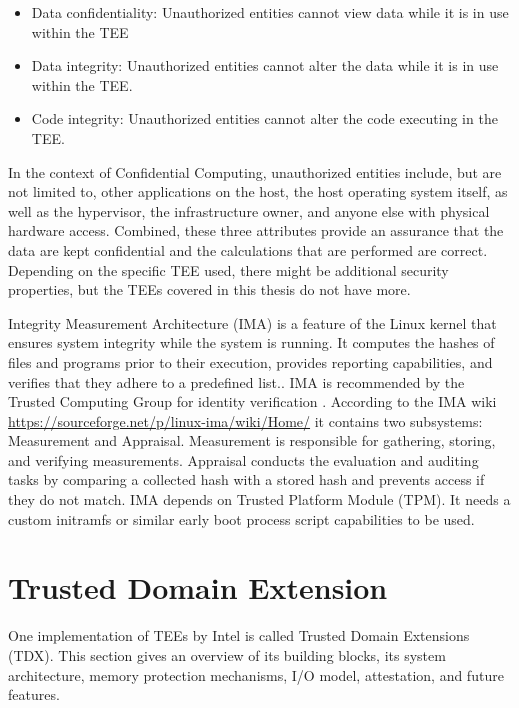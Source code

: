\begin{itemize} 
    \item \guillemotright Data confidentiality: Unauthorized entities cannot view data while it is in use within the TEE
    \item Data integrity: Unauthorized entities cannot alter the data while it is in use within the TEE.
    \item Code integrity: Unauthorized entities cannot alter the code executing in the TEE.\guillemotleft \cite{noauthor_ccc_outreach_whitepaper_updated_november_2022pdf_2023}
\end{itemize} 
In the context of Confidential Computing, unauthorized entities include, but are not limited to, other applications on the host, the host operating system itself, as well as the hypervisor, the infrastructure owner, and anyone else with physical hardware access. 
Combined, these three attributes provide an assurance that the data are kept confidential and the calculations that are performed are correct.
Depending on the specific TEE used, there might be additional security properties, but the TEEs covered in this thesis do not have more\cite{noauthor_ccc_outreach_whitepaper_updated_november_2022pdf_2023}.


\label{IMA}

Integrity Measurement Architecture (IMA) is a feature of the Linux kernel that ensures system integrity while the system is running. It computes the hashes of files and programs prior to their execution, provides reporting capabilities, and verifies that they adhere to a predefined list.\cite{Luo_container_ima}. IMA is recommended by the Trusted Computing Group for identity verification \cite{trusted_computing_group_tcg_2023}. According to the IMA wiki \url{https://sourceforge.net/p/linux-ima/wiki/Home/} it contains two subsystems: Measurement and Appraisal. Measurement is responsible for gathering, storing, and verifying measurements. Appraisal conducts the evaluation and auditing tasks by comparing a collected hash with a stored hash and prevents access if they do not match. IMA depends on Trusted Platform Module (TPM)\cite{Luo_container_ima}. It needs a custom initramfs or similar early boot process script capabilities to be used.

\section{Trusted Domain Extension}
One implementation of TEEs by Intel is called Trusted Domain Extensions (TDX). This section gives an overview of its building blocks, its system architecture, memory protection mechanisms, I/O model, attestation, and future features.
